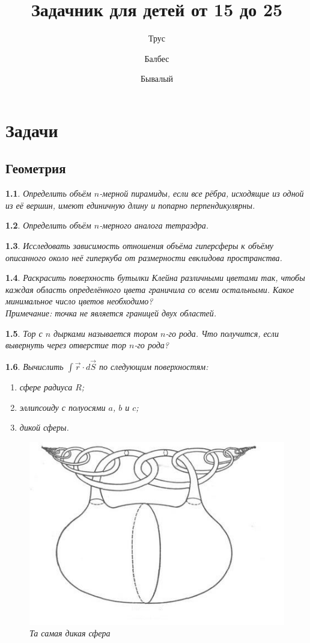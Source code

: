 \documentclass[a4paper]{book}
\author{Трус \and Балбес \and Бывалый}
\title{Задачник для детей от 15 до 25}
\theoremstyle{problemstyle}
\newtheorem{problem}{} %
\begin{document}
    \maketitle
    
    \tableofcontents
    \part{Задачи}
    \chapter{Геометрия}
    \begin{problem}
        Определить объём \(n\)-мерной пирамиды, если все рёбра, исходящие из
        одной из её вершин, имеют единичную длину и попарно перпендикулярны.
    \end{problem}
    \begin{problem}
        Определить объём \(n\)-мерного аналога тетраэдра.
    \end{problem}
    \begin{problem}
        Исследовать зависимость отношения объёма гиперсферы к объёму описанного
        около неё гиперкуба от размерности евклидова пространства.
    \end{problem}
    \begin{problem}
        Раскрасить поверхность бутылки Клейна различными цветами так, чтобы
        каждая область определённого цвета граничила со всеми остальными.
        Какое минимальное число цветов необходимо?\\
        \textit{Примечание: точка не является границей двух областей.}
    \end{problem}
    \begin{problem}
        Тор с \(n\) дырками называется тором \(n\)-го рода. Что получится, если
        вывернуть через отверстие тор \(n\)-го рода?
    \end{problem}
    \begin{problem}
        Вычислить \( \int \vec{r} \cdot d\vec{S} \) по следующим
        поверхностям:
        \begin{enumerate}
            \item сфере радиуса \( R \);
            \item эллипсоиду с полуосями \( a \), \( b \) и \( c \);
            \item дикой сферы.
        \end{enumerate}
        \begin{figure}[h]
            \centering
            \includegraphics[width=0.5\linewidth]{images/wild-sphere}
            \caption{Та самая дикая сфера}
            \label{fig:wild-sphere}
        \end{figure}
    \end{problem}
\end{document}
